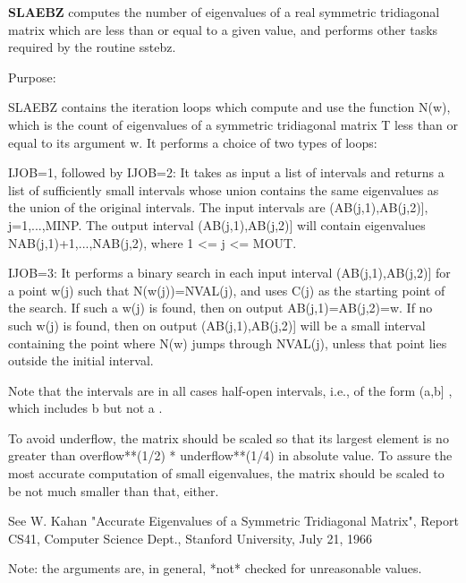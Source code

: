 {\bfseries S\+L\+A\+E\+B\+Z} computes the number of eigenvalues of a real symmetric tridiagonal matrix which are less than or equal to a given value, and performs other tasks required by the routine sstebz. 

 \begin{DoxyParagraph}{Purpose\+: }
\begin{DoxyVerb} SLAEBZ contains the iteration loops which compute and use the
 function N(w), which is the count of eigenvalues of a symmetric
 tridiagonal matrix T less than or equal to its argument  w.  It
 performs a choice of two types of loops:

 IJOB=1, followed by
 IJOB=2: It takes as input a list of intervals and returns a list of
         sufficiently small intervals whose union contains the same
         eigenvalues as the union of the original intervals.
         The input intervals are (AB(j,1),AB(j,2)], j=1,...,MINP.
         The output interval (AB(j,1),AB(j,2)] will contain
         eigenvalues NAB(j,1)+1,...,NAB(j,2), where 1 <= j <= MOUT.

 IJOB=3: It performs a binary search in each input interval
         (AB(j,1),AB(j,2)] for a point  w(j)  such that
         N(w(j))=NVAL(j), and uses  C(j)  as the starting point of
         the search.  If such a w(j) is found, then on output
         AB(j,1)=AB(j,2)=w.  If no such w(j) is found, then on output
         (AB(j,1),AB(j,2)] will be a small interval containing the
         point where N(w) jumps through NVAL(j), unless that point
         lies outside the initial interval.

 Note that the intervals are in all cases half-open intervals,
 i.e., of the form  (a,b] , which includes  b  but not  a .

 To avoid underflow, the matrix should be scaled so that its largest
 element is no greater than  overflow**(1/2) * underflow**(1/4)
 in absolute value.  To assure the most accurate computation
 of small eigenvalues, the matrix should be scaled to be
 not much smaller than that, either.

 See W. Kahan "Accurate Eigenvalues of a Symmetric Tridiagonal
 Matrix", Report CS41, Computer Science Dept., Stanford
 University, July 21, 1966

 Note: the arguments are, in general, *not* checked for unreasonable
 values.\end{DoxyVerb}
 
\end{DoxyParagraph}

